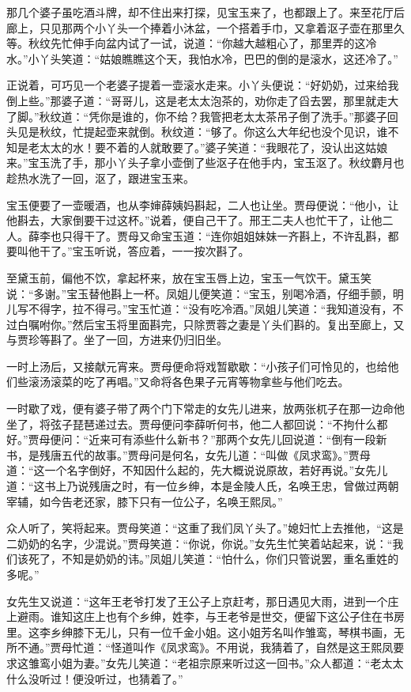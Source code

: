 那几个婆子虽吃酒斗牌，却不住出来打探，见宝玉来了，也都跟上了。来至花厅后廊上，只见那两个小丫头一个捧着小沐盆，一个搭着手巾，又拿着沤子壶在那里久等。秋纹先忙伸手向盆内试了一试，说道：``你越大越粗心了，那里弄的这冷水。''小丫头笑道：``姑娘瞧瞧这个天，我怕水冷，巴巴的倒的是滚水，这还冷了。''

正说着，可巧见一个老婆子提着一壶滚水走来。小丫头便说：``好奶奶，过来给我倒上些。''那婆子道：``哥哥儿，这是老太太泡茶的，劝你走了舀去罢，那里就走大了脚。''秋纹道：``凭你是谁的，你不给？我管把老太太茶吊子倒了洗手。''那婆子回头见是秋纹，忙提起壶来就倒。秋纹道：``够了。你这么大年纪也没个见识，谁不知是老太太的水！要不着的人就敢要了。''婆子笑道：``我眼花了，没认出这姑娘来。''宝玉洗了手，那小丫头子拿小壶倒了些沤子在他手内，宝玉沤了。秋纹麝月也趁热水洗了一回，沤了，跟进宝玉来。

宝玉便要了一壶暖酒，也从李婶薛姨妈斟起，二人也让坐。贾母便说：``他小，让他斟去，大家倒要干过这杯。''说着，便自己干了。邢王二夫人也忙干了，让他二人。薛李也只得干了。贾母又命宝玉道：``连你姐姐妹妹一齐斟上，不许乱斟，都要叫他干了。''宝玉听说，答应着，一一按次斟了。

至黛玉前，偏他不饮，拿起杯来，放在宝玉唇上边，宝玉一气饮干。黛玉笑说：``多谢。''宝玉替他斟上一杯。凤姐儿便笑道：``宝玉，别喝冷酒，仔细手颤，明儿写不得字，拉不得弓。''宝玉忙道：``没有吃冷酒。''凤姐儿笑道：``我知道没有，不过白嘱咐你。''然后宝玉将里面斟完，只除贾蓉之妻是丫头们斟的。复出至廊上，又与贾珍等斟了。坐了一回，方进来仍归旧坐。

一时上汤后，又接献元宵来。贾母便命将戏暂歇歇：``小孩子们可怜见的，也给他们些滚汤滚菜的吃了再唱。''又命将各色果子元宵等物拿些与他们吃去。

一时歇了戏，便有婆子带了两个门下常走的女先儿进来，放两张杌子在那一边命他坐了，将弦子琵琶递过去。贾母便问李薛听何书，他二人都回说：``不拘什么都好。''贾母便问：``近来可有添些什么新书？''那两个女先儿回说道：``倒有一段新书，是残唐五代的故事。''贾母问是何名，女先儿道：``叫做《凤求鸾》。''贾母道：``这一个名字倒好，不知因什么起的，先大概说说原故，若好再说。''女先儿道：``这书上乃说残唐之时，有一位乡绅，本是金陵人氏，名唤王忠，曾做过两朝宰辅，如今告老还家，膝下只有一位公子，名唤王熙凤。''

众人听了，笑将起来。贾母笑道：``这重了我们凤丫头了。''媳妇忙上去推他，``这是二奶奶的名字，少混说。''贾母笑道：``你说，你说。''女先生忙笑着站起来，说：``我们该死了，不知是奶奶的讳。''凤姐儿笑道：``怕什么，你们只管说罢，重名重姓的多呢。''

女先生又说道：``这年王老爷打发了王公子上京赶考，那日遇见大雨，进到一个庄上避雨。谁知这庄上也有个乡绅，姓李，与王老爷是世交，便留下这公子住在书房里。这李乡绅膝下无儿，只有一位千金小姐。这小姐芳名叫作雏鸾，琴棋书画，无所不通。''贾母忙道：``怪道叫作《凤求鸾》。不用说，我猜着了，自然是这王熙凤要求这雏鸾小姐为妻。''女先儿笑道：``老祖宗原来听过这一回书。''众人都道：``老太太什么没听过！便没听过，也猜着了。''

